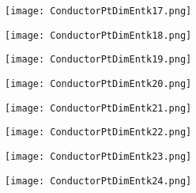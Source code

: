 \documentclass[pdf]{beamer}
\begin{document}
\begin{frame}
\begin{figure}[!h]
\centering
\texttt{[image: ConductorPtDimEntk17.png]}
\end{figure}
\end{frame}

\begin{frame}
\begin{figure}[!h]
\centering
\texttt{[image: ConductorPtDimEntk18.png]}
\end{figure}
\end{frame}

\begin{frame}
\begin{figure}[!h]
\centering
\texttt{[image: ConductorPtDimEntk19.png]}
\end{figure}
\end{frame}

\begin{frame}
\begin{figure}[!h]
\centering
\texttt{[image: ConductorPtDimEntk20.png]}
\end{figure}
\end{frame}

\begin{frame}
\begin{figure}[!h]
\centering
\texttt{[image: ConductorPtDimEntk21.png]}
\end{figure}
\end{frame}

\begin{frame}
\begin{figure}[!h]
\centering
\texttt{[image: ConductorPtDimEntk22.png]}
\end{figure}
\end{frame}

\begin{frame}
\begin{figure}[!h]
\centering
\texttt{[image: ConductorPtDimEntk23.png]}
\end{figure}
\end{frame}

\begin{frame}
\begin{figure}[!h]
\centering
\texttt{[image: ConductorPtDimEntk24.png]}
\end{figure}
\end{frame}
\end{document}
